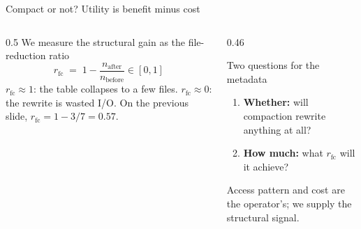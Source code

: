 \documentclass[aspectratio=169, 10pt]{beamer}
\newcommand{\rfc}{r_{\mathrm{fc}}}
\begin{document}
\begin{frame}{Compact or not? Utility is benefit minus cost}
\vspace{1mm}
\begin{columns}[T]
\begin{column}{0.5\textwidth}
We measure the structural gain as the \alert{file-reduction ratio}
\[
  \rfc \;=\; 1 - \frac{n_{\mathrm{after}}}{n_{\mathrm{before}}} \in [0,1]
\]
\small $\rfc \approx 1$: the table collapses to a few files.
$\rfc \approx 0$: the rewrite is wasted I/O.
On the previous slide, $\rfc = 1 - 3/7 = 0.57$.
\end{column}
\begin{column}{0.46\textwidth}
\begin{block}{Two questions for the metadata}
\begin{enumerate}
  \item \textbf{Whether:} will compaction rewrite anything at all?
  \item \textbf{How much:} what $\rfc$ will it achieve?
\end{enumerate}
\end{block}
\small Access pattern and cost are the operator's; we supply the
structural signal.
\end{column}
\end{columns}
\end{frame}

\end{document}

